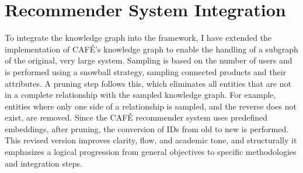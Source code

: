 \section{Recommender System Integration}
To integrate the knowledge graph into the framework, I have extended the implementation of CAFÉ’s knowledge graph to enable the handling of a subgraph of the original, very large system. Sampling is based on the number of users and is performed using a snowball strategy, sampling connected products and their attributes. A pruning step follows this, which eliminates all entities that are not in a complete relationship with the sampled knowledge graph. For example, entities where only one side of a relationship is sampled, and the reverse does not exist, are removed. Since the CAFÉ recommender system uses predefined embeddings, after pruning, the conversion of IDs from old to new is performed.
This revised version improves clarity, flow, and academic tone, and structurally it emphasizes a logical progression from general objectives to specific methodologies and integration steps.



